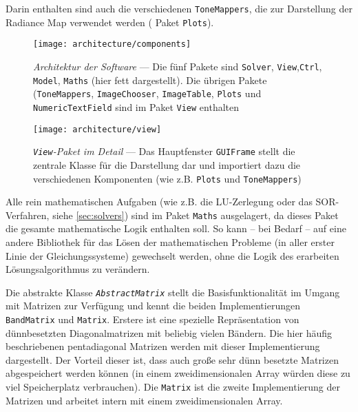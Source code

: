 Darin enthalten sind auch die verschiedenen \texttt{ToneMappers}, die zur Darstellung der \gls{Radiance Map} verwendet werden ( Paket \texttt{Plots}).

\begin{figure}
  \begin{center}
    \texttt{[image: architecture/components]}
    \caption{\textit{Architektur der Software} --- Die fünf Pakete sind \texttt{Solver}, \texttt{View},\texttt{Ctrl}, \texttt{Model}, \texttt{Maths} (hier fett dargestellt).  Die übrigen Pakete (\texttt{ToneMappers}, \texttt{ImageChooser}, \texttt{ImageTable}, \texttt{Plots} und \texttt{NumericTextField} sind im Paket \texttt{View} enthalten}
    \label{fig:arch:components}
  \end{center}
\end{figure}


\begin{figure}
  \begin{center}
    \texttt{[image: architecture/view]}
    \caption{\textit{\texttt{View}-Paket im Detail} --- Das Hauptfenster \texttt{GUIFrame} stellt die zentrale Klasse für die Darstellung dar und importiert dazu die verschiedenen Komponenten (wie z.B. \texttt{Plots} und \texttt{ToneMappers})}
    \label{fig:arch:view}
  \end{center}
\end{figure}

Alle rein mathematischen Aufgaben (wie z.B. die LU-Zerlegung oder das SOR-Verfahren, siehe \autoref{sec:solvers}) sind im Paket \texttt{Maths} ausgelagert, da dieses Paket die gesamte mathematische Logik enthalten soll. So kann -- bei Bedarf -- auf eine andere Bibliothek für das Lösen der mathematischen Probleme (in aller erster Linie der Gleichungssysteme) gewechselt werden, ohne die Logik des erarbeiten Lösungsalgorithmus zu verändern. 

Die abstrakte Klasse \textit{\texttt{AbstractMatrix}} stellt die Basisfunktionalität im Umgang mit Matrizen zur Verfügung und kennt die beiden Implementierungen \texttt{BandMatrix} und \texttt{Matrix}. Erstere ist eine spezielle Repräsentation von dünnbesetzten Diagonalmatrizen mit beliebig vielen Bändern. Die hier häufig beschriebenen pentadiagonal Matrizen werden mit dieser Implementierung dargestellt. Der Vorteil dieser ist, dass auch große sehr dünn besetzte Matrizen abgespeichert werden können (in einem zweidimensionalen Array würden diese zu viel Speicherplatz verbrauchen). Die \texttt{Matrix} ist die zweite Implementierung der Matrizen und arbeitet intern mit einem zweidimensionalen Array.

